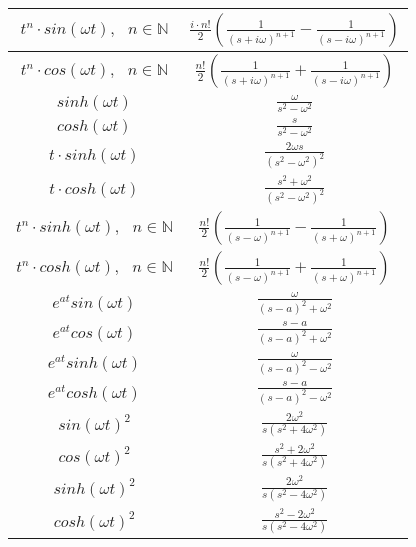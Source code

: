 \documentclass[./\jobname.tex]{subfiles}
\begin{document}
\begin{table}[H]
{\begin{tabular}{|c|c|}
			$t^n \cdot sin(\omega t), \text{ } n \in \mathbb{N}$ & $\frac{i \cdot n!}{2} \left( \frac{1}{(s + i \omega)^{n + 1}} - \frac{1}{(s - i \omega)^{n + 1}}\right)$ \\ \hline
			$t^n \cdot cos(\omega t), \text{ } n \in \mathbb{N}$ & $\frac{n!}{2} \left( \frac{1}{(s + i \omega)^{n + 1}} + \frac{1}{(s - i \omega)^{n + 1}}\right)$ \\ \hline
			$sinh(\omega t)$ & $\frac{\omega}{s^2 - \omega^2}$ \\ \hline
			$cosh(\omega t)$ & $\frac{s}{s^2 - \omega^2}$ \\ \hline
			$t \cdot sinh(\omega t)$ & $\frac{2 \omega s}{(s^2 - \omega^2)^2}$ \\ \hline
			$t \cdot cosh(\omega t)$ & $\frac{s^2 + \omega^2}{(s^2 - \omega^2)^2}$ \\ \hline
			$t^n \cdot sinh(\omega t), \text{ } n \in \mathbb{N}$ & $ \frac{n!}{2} \left( \frac{1}{(s - \omega)^{n + 1}} - \frac{1}{(s + \omega)^{n+1}} \right)$ \\ \hline
			$t^n \cdot cosh(\omega t), \text{ } n \in \mathbb{N}$ & $ \frac{n!}{2} \left( \frac{1}{(s - \omega)^{n + 1}} + \frac{1}{(s + \omega)^{n+1}} \right)$ \\ \hline
			$e^{at} sin(\omega t)$ & $\frac{\omega}{(s - a)^2 + \omega^2}$ \\ \hline
			$e^{at} cos(\omega t)$ & $\frac{s - a}{(s - a)^2 + \omega^2}$ \\ \hline
			$e^{at} sinh(\omega t)$ & $\frac{\omega}{(s - a)^2 - \omega^2}$ \\ \hline
			$e^{at} cosh(\omega t)$ & $\frac{s - a}{(s - a)^2 - \omega^2}$ \\ \hline
			$sin(\omega t)^2$ & $\frac{2 \omega^2}{s(s^2 + 4\omega^2)}$ \\ \hline
			$cos(\omega t)^2$ & $\frac{s^2 + 2\omega^2}{s(s^2 + 4\omega^2)}$ \\ \hline
			$sinh(\omega t)^2$ & $\frac{2 \omega^2}{s(s^2 - 4\omega^2)}$ \\ \hline
			$cosh(\omega t)^2$ & $\frac{s^2 - 2\omega^2}{s(s^2 - 4\omega^2)}$ \\ \hline
		\end{tabular}
	}
\end{table}
\end{document}
